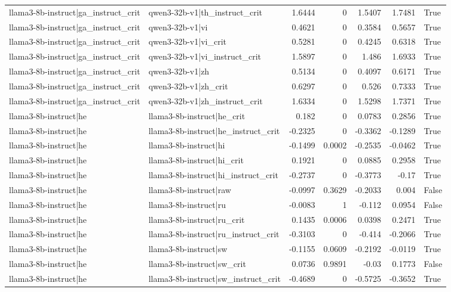 \begin{table}
\begin{tabular}{l l r r r r l}
llama3-8b-instruct|ga_instruct_crit & qwen3-32b-v1|th_instruct_crit & 1.6444 & 0 & 1.5407 & 1.7481 & True \\
llama3-8b-instruct|ga_instruct_crit & qwen3-32b-v1|vi & 0.4621 & 0 & 0.3584 & 0.5657 & True \\
llama3-8b-instruct|ga_instruct_crit & qwen3-32b-v1|vi_crit & 0.5281 & 0 & 0.4245 & 0.6318 & True \\
llama3-8b-instruct|ga_instruct_crit & qwen3-32b-v1|vi_instruct_crit & 1.5897 & 0 & 1.486 & 1.6933 & True \\
llama3-8b-instruct|ga_instruct_crit & qwen3-32b-v1|zh & 0.5134 & 0 & 0.4097 & 0.6171 & True \\
llama3-8b-instruct|ga_instruct_crit & qwen3-32b-v1|zh_crit & 0.6297 & 0 & 0.526 & 0.7333 & True \\
llama3-8b-instruct|ga_instruct_crit & qwen3-32b-v1|zh_instruct_crit & 1.6334 & 0 & 1.5298 & 1.7371 & True \\
llama3-8b-instruct|he & llama3-8b-instruct|he_crit & 0.182 & 0 & 0.0783 & 0.2856 & True \\
llama3-8b-instruct|he & llama3-8b-instruct|he_instruct_crit & -0.2325 & 0 & -0.3362 & -0.1289 & True \\
llama3-8b-instruct|he & llama3-8b-instruct|hi & -0.1499 & 0.0002 & -0.2535 & -0.0462 & True \\
llama3-8b-instruct|he & llama3-8b-instruct|hi_crit & 0.1921 & 0 & 0.0885 & 0.2958 & True \\
llama3-8b-instruct|he & llama3-8b-instruct|hi_instruct_crit & -0.2737 & 0 & -0.3773 & -0.17 & True \\
llama3-8b-instruct|he & llama3-8b-instruct|raw & -0.0997 & 0.3629 & -0.2033 & 0.004 & False \\
llama3-8b-instruct|he & llama3-8b-instruct|ru & -0.0083 & 1 & -0.112 & 0.0954 & False \\
llama3-8b-instruct|he & llama3-8b-instruct|ru_crit & 0.1435 & 0.0006 & 0.0398 & 0.2471 & True \\
llama3-8b-instruct|he & llama3-8b-instruct|ru_instruct_crit & -0.3103 & 0 & -0.414 & -0.2066 & True \\
llama3-8b-instruct|he & llama3-8b-instruct|sw & -0.1155 & 0.0609 & -0.2192 & -0.0119 & True \\
llama3-8b-instruct|he & llama3-8b-instruct|sw_crit & 0.0736 & 0.9891 & -0.03 & 0.1773 & False \\
llama3-8b-instruct|he & llama3-8b-instruct|sw_instruct_crit & -0.4689 & 0 & -0.5725 & -0.3652 & True \\

\end{tabular}
\end{table}
